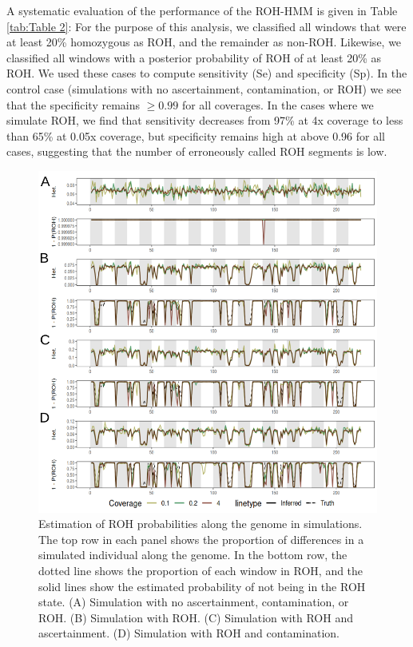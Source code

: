 \documentclass[12pt, letterpaper]{article}
\begin{document}
A systematic evaluation of the performance of the ROH-HMM is given in Table \ref{tab:Table 2}: For the purpose of this analysis, we classified all windows that were at least 20\% homozygous as ROH, and the remainder as non-ROH. Likewise, we classified all windows with a posterior probability of ROH of at least 20\% as ROH. We used these cases to compute sensitivity (Se) and specificity (Sp). In the control case (simulations with no ascertainment, contamination, or ROH) we see that the specificity remains $\geq0.99$ for all coverages. In the cases where we simulate ROH, we find that sensitivity decreases from 97\% at 4x coverage to less than 65\% at 0.05x coverage, but specificity remains high at above 0.96 for all cases, suggesting that the number of erroneously called ROH segments is low.

\begin{figure}[ht!]
    \includegraphics[width=16.5cm]{plots/inkscape_finalImg/ROHplot_sub.png}
    \centering
    \caption{Estimation of ROH probabilities along the genome in simulations. The top row in each panel shows the proportion of differences in a simulated individual along the genome. In the bottom row, the dotted line shows the proportion of each window in ROH, and the solid lines show the estimated probability of not being in the ROH state. (A) Simulation with no ascertainment, contamination, or ROH. (B) Simulation with ROH. (C) Simulation with ROH and ascertainment. (D) Simulation with ROH and contamination.}
    \label{fig2:ROH}
\end{figure}
\end{document}
